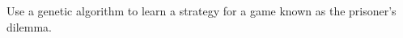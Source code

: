 \begin{proposition}
    Use a genetic algorithm to learn a strategy for a game known as the prisoner's dilemma.
\end{proposition}